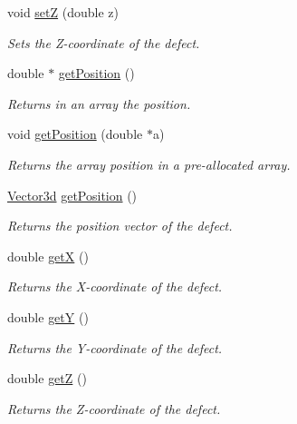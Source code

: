 \begin{DoxyCompactItemize}
void \hyperlink{classDefect_abb0b16c44a1b04d782f5c5f598b49d5b}{set\-Z} (double z)
\begin{DoxyCompactList}\small\item\em Sets the Z-\/coordinate of the defect. \end{DoxyCompactList}\item 
double $\ast$ \hyperlink{classDefect_a270caed3561fa5fa284af6427b6ca2e4}{get\-Position} ()
\begin{DoxyCompactList}\small\item\em Returns in an array the position. \end{DoxyCompactList}\item 
void \hyperlink{classDefect_aace5c752b85c368631746abc3d5bd714}{get\-Position} (double $\ast$a)
\begin{DoxyCompactList}\small\item\em Returns the array position in a pre-\/allocated array. \end{DoxyCompactList}\item 
\hyperlink{classVector3d}{Vector3d} \hyperlink{classDefect_a270caed3561fa5fa284af6427b6ca2e4}{get\-Position} ()
\begin{DoxyCompactList}\small\item\em Returns the position vector of the defect. \end{DoxyCompactList}\item 
double \hyperlink{classDefect_a01b96c453c13db82b5835682e1849dc0}{get\-X} ()
\begin{DoxyCompactList}\small\item\em Returns the X-\/coordinate of the defect. \end{DoxyCompactList}\item 
double \hyperlink{classDefect_a9ea8df3b4c621762a327813056e63911}{get\-Y} ()
\begin{DoxyCompactList}\small\item\em Returns the Y-\/coordinate of the defect. \end{DoxyCompactList}\item 
double \hyperlink{classDefect_a6f59edeca7ca8bfa01c54fd6b1a62374}{get\-Z} ()
\begin{DoxyCompactList}\small\item\em Returns the Z-\/coordinate of the defect. \end{DoxyCompactList}\end{DoxyCompactItemize}
